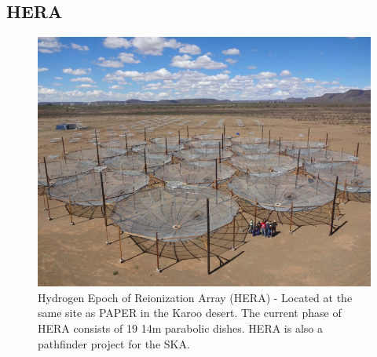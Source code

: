 \documentclass[a0,landscape]{a0poster}
\begin{document}
\begin{multicols}{4}
\subsection*{HERA}
\begin{figure}[H]
\centering
\label{fig:HERA}
\includegraphics[width=0.6\linewidth]{figures/HERA19.png}
\caption{Hydrogen Epoch of Reionization Array (HERA) - Located at the same site as PAPER in the Karoo desert. The current phase of HERA consists of 19 14m parabolic dishes. HERA is also a pathfinder project for the SKA.}
\end{figure}






\color{DarkSlateGray} %





\end{multicols}
\end{document}

